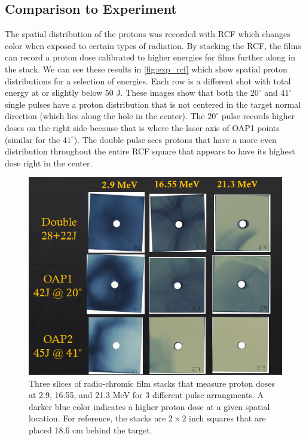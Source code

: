 \subsection{Comparison to Experiment}

The spatial distribution of the protons was recorded with \gls{RCF} which changes color when exposed to certain types of radiation. By stacking the \gls{RCF}, the films can record a proton dose calibrated to higher energies for films further along in the stack. We can see these results in \autoref{fig:exp_rcf} which show spatial proton distributions for a selection of energies. Each row is a different shot with total energy at or slightly below 50 J. These images show that both the $20^\circ$ and $41^\circ$ single pulses have a proton distribution that is not centered in the target normal direction (which lies along the hole in the center). The $20^\circ$ pulse records higher doses on the right side because that is where the laser axis of OAP1 points (similar for the $41^\circ$). The double pulse sees protons that have a more even distribution throughout the entire \gls{RCF} square that appears to have its highest dose right in the center.

\begin{figure}
	\centering
	\includegraphics[width=0.9\linewidth]{planning/images/titan/rcf.png}
	\caption{Three slices of radio-chromic film stacks that measure proton doses at 2.9, 16.55, and 21.3 MeV for 3 different pulse arrangments. A darker blue color indicates a higher proton dose at a given spatial location. For reference, the stacks are $2 \times 2$ inch squares that are placed 18.6 cm behind the target.}
	\label{fig:exp_rcf}
\end{figure}

